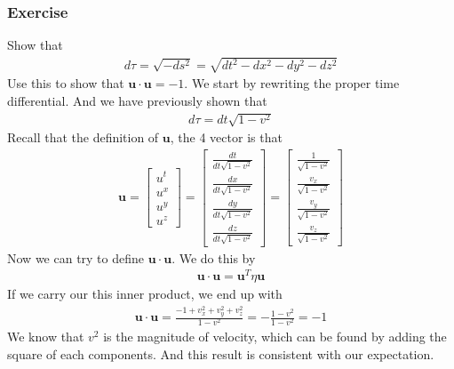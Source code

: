 \documentclass[12pt]{book}
\begin{document}
            \subsubsection{Exercise}
                Show that
                \begin{align}
                d\tau = \sqrt{-ds^2} = \sqrt{dt^2 - dx^2 - dy^2 - dz^2}
                \end{align}
                Use this to show that $\mathbf{u}\cdot\mathbf{u} = -1$. 
                We start by rewriting the proper time differential. And we have previously shown that
                \begin{align}
                d\tau = dt\sqrt{1-v^2}
                \end{align}
                Recall that the definition of $\mathbf{u}$, the 4 vector is that 
                \begin{align}
                \mathbf{u}= 
                \begin{bmatrix}
                u^t \\
                u^x \\
                u^y \\
                u^z
                \end{bmatrix}
                =
                \begin{bmatrix}
                \frac{dt}{dt\sqrt{1 - v^2}} \\
                \frac{dx}{dt\sqrt{1 - v^2}} \\
                \frac{dy}{dt\sqrt{1 - v^2}} \\
                \frac{dz}{dt\sqrt{1 - v^2}}
                \end{bmatrix}
                =
                \begin{bmatrix}
                \frac{1}{\sqrt{1 - v^2}} \\
                \frac{v_x}{\sqrt{1 - v^2}} \\
                \frac{v_y}{\sqrt{1 - v^2}} \\
                \frac{v_z}{\sqrt{1 - v^2}}
                \end{bmatrix}
                \end{align}
            Now we can try to define $\mathbf{u}\cdot\mathbf{u}$. We do this by
            \begin{align}
            \mathbf{u}\cdot\mathbf{u}= \mathbf{u}^T\eta \mathbf{u}
            \end{align}
            If we carry our this inner product, we end up with
            \begin{align}
            \mathbf{u}\cdot\mathbf{u} = \frac{-1 + v_x^2+v_y^2+v_z^2}{1-v^2} = -\frac{1-v^2}{1-v^2} = -1
            \end{align}
            We know that $v^2$ is the magnitude of velocity, which can be found by adding the square of each components. And this result is consistent with our expectation.
\end{document}
